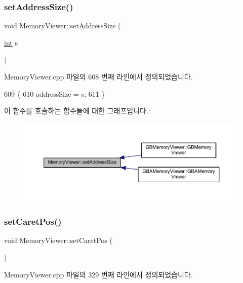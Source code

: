 \subsubsection{\texorpdfstring{set\+Address\+Size()}{setAddressSize()}}
{\footnotesize\ttfamily void Memory\+Viewer\+::set\+Address\+Size (\begin{DoxyParamCaption}\item[{\mbox{\hyperlink{_util_8cpp_a0ef32aa8672df19503a49fab2d0c8071}{int}}}]{s }\end{DoxyParamCaption})}



Memory\+Viewer.\+cpp 파일의 608 번째 라인에서 정의되었습니다.


\begin{DoxyCode}
609 \{
610   addressSize = s;
611 \}
\end{DoxyCode}
이 함수를 호출하는 함수들에 대한 그래프입니다.\+:
\nopagebreak
\begin{figure}[H]
\begin{center}
\leavevmode
\includegraphics[width=350pt]{class_memory_viewer_a64938573e15f4d5b31eea26dc6788d0e_icgraph}
\end{center}
\end{figure}
\mbox{\label{class_memory_viewer_abfed49727a6de1b52e5495ed96816759}} 
\subsubsection{\texorpdfstring{set\+Caret\+Pos()}{setCaretPos()}}
{\footnotesize\ttfamily void Memory\+Viewer\+::set\+Caret\+Pos (\begin{DoxyParamCaption}{ }\end{DoxyParamCaption})}



Memory\+Viewer.\+cpp 파일의 329 번째 라인에서 정의되었습니다.


